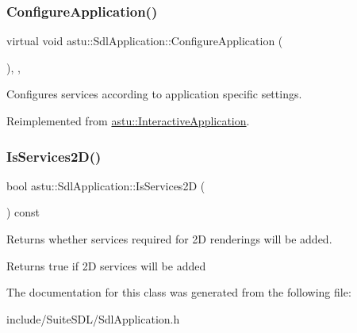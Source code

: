 \mbox{\label{classastu_1_1SdlApplication_af309f097b9ec604101d9c0cbd66e8ba1}} 
\subsubsection{\texorpdfstring{Configure\+Application()}{ConfigureApplication()}}
{\footnotesize\ttfamily virtual void astu\+::\+Sdl\+Application\+::\+Configure\+Application (\begin{DoxyParamCaption}{ }\end{DoxyParamCaption})\hspace{0.3cm}{\ttfamily [override]}, {\ttfamily [protected]}, {\ttfamily [virtual]}}

Configures services according to application specific settings. 

Reimplemented from \hyperlink{classastu_1_1InteractiveApplication_abec13f308f2a707764a322ecd1bba42d}{astu\+::\+Interactive\+Application}.

\mbox{\label{classastu_1_1SdlApplication_a9eff9632914987b4f7998e341d203b4b}} 
\subsubsection{\texorpdfstring{Is\+Services2\+D()}{IsServices2D()}}
{\footnotesize\ttfamily bool astu\+::\+Sdl\+Application\+::\+Is\+Services2D (\begin{DoxyParamCaption}{ }\end{DoxyParamCaption}) const}

Returns whether services required for 2D renderings will be added.

\begin{DoxyReturn}{Returns}
{\ttfamily true} if 2D services will be added 
\end{DoxyReturn}


The documentation for this class was generated from the following file\+:\begin{DoxyCompactItemize}
\item 
include/\+Suite\+S\+D\+L/Sdl\+Application.\+h\end{DoxyCompactItemize}
